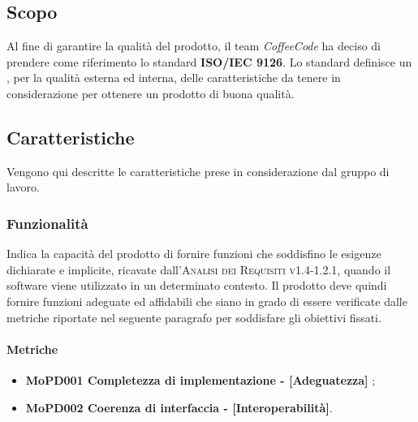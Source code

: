 \documentclass[../piano-di-qualifica.tex]{subfiles}
\begin{document}
\subsection{Scopo}%
\label{sec:scopo}
Al fine di garantire la qualità del prodotto, il team \emph{CoffeeCode} ha deciso di prendere come riferimento lo standard \textbf{ISO/IEC 9126}.
Lo standard definisce un , per la qualità esterna ed interna, delle caratteristiche da tenere in considerazione per ottenere un prodotto di buona qualità.

\subsection{Caratteristiche}%
\label{sub:caratteristiche}
Vengono qui descritte le caratteristiche prese in considerazione dal gruppo di lavoro.

\subsubsection{Funzionalità}%
\label{sub:funzionalita}
Indica la capacità del prodotto di fornire funzioni che soddisfino le esigenze dichiarate e implicite, ricavate dall'\textsc{Analisi dei Requisiti v1.4-1.2.1}, quando il software viene utilizzato in un determinato contesto.
Il prodotto deve quindi fornire funzioni adeguate ed affidabili che siano in grado di essere verificate dalle metriche riportate nel seguente paragrafo per soddisfare gli obiettivi fissati.

\paragraph{Metriche}
\label{sub:metriche}
\begin{itemize}
    \item \textbf{MoPD001 Completezza di implementazione - [Adeguatezza]} ;
    \item \textbf{MoPD002 Coerenza di interfaccia - [Interoperabilità]}.
\end{itemize}
\end{document}
